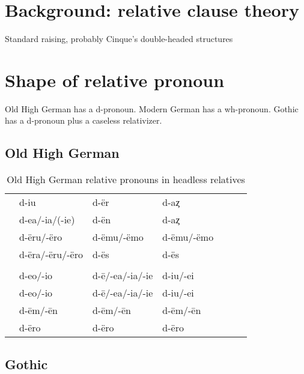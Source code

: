   \section{Background: relative clause theory}
Standard raising, probably Cinque's double-headed structures


  \section{Shape of relative pronoun}
Old High German has a d-pronoun. Modern German has a wh-pronoun. Gothic has a d-pronoun plus a caseless relativizer.


\subsection{Old High German}

\begin{table}[h]\label{tbl:paradigmohg}
	\center
	\caption {Old High German relative pronouns in headless relatives}
	\begin{minipage}{0.85\linewidth}
		\begin{tabularx}{\textwidth}{c *{6}{Y}}
		\toprule
			&           &            &     \\
		\midrule
		 & d-iu             & d-ër       	     & d-aȥ				\\
			& d-ea/-ia/(-ie)   & d-ën				       & d-aȥ		    \\
			& d-ëru/-ëro	     & d-ëmu/-ëmo	       & d-ëmu/-ëmo \\
     & d-ëra/-ëru/-ëro  & d-ës              & d-ës       \\
		\bottomrule
    \toprule
    	&           &            &     \\
    \midrule
     & d-eo/-io         &  d-ē/-ea/-ia/-ie  & d-iu/-ei   \\
     & d-eo/-io         &  d-ē/-ea/-ia/-ie  & d-iu/-ei   \\
     & d-ēm/-ēn         &  d-ēm/-ēn         & d-ēm/-ēn   \\
     & d-ëro            &  d-ëro            & d-ëro      \\
    \bottomrule
		\end{tabularx}
	\end{minipage}
\end{table}


\subsection{Gothic}

